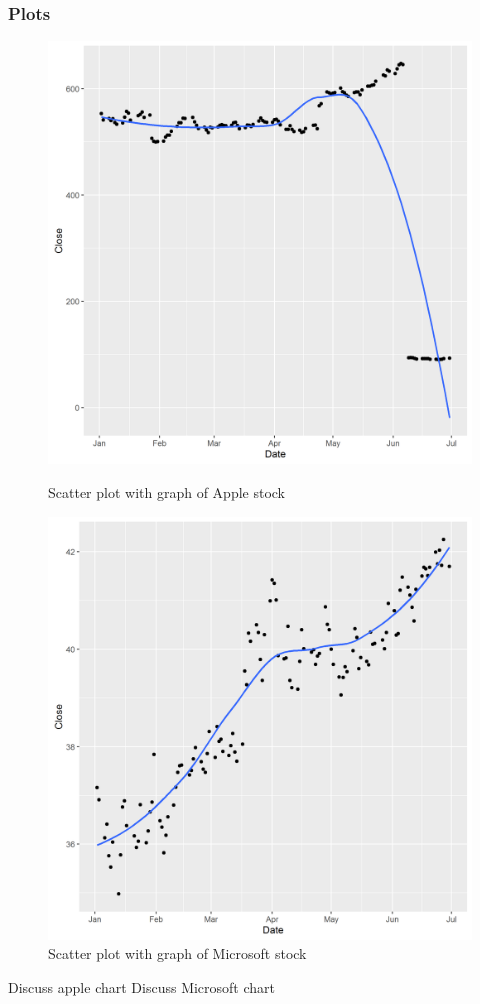 \documentclass[paper=a4, fontsize=11pt]{scrartcl} %
\numberwithin{equation}{section} %
\numberwithin{figure}{section} %
\numberwithin{table}{section} %
\begin{document}
\subsubsection{Plots}
\begin{figure}[!htb]
  \includegraphics[width=\linewidth]{graph/AAPL7.png}
  \caption{Scatter plot with graph of Apple stock}
\endminipage\hfill
{}
  \includegraphics[width=\linewidth]{graph/MSFT7.png}
  \caption{Scatter plot with graph of Microsoft stock}
\endminipage\hfill

\end{figure}
Discuss apple chart
Discuss Microsoft chart
\end{document}
